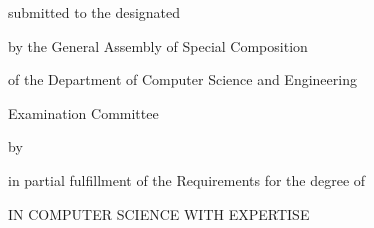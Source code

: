 \makeatletter

{\LARGE \@title}

{\Large
	\vfill \vfill \csethesisTypeEn

	\vfill        submitted to the designated

	\vfill        by the General Assembly of Special Composition

	              of the Department of Computer Science and Engineering

	              Examination Committee

	\vfill        by

	\vfill        {\LARGE \@author}

	\vfill        in partial fulfillment of the Requirements for the degree of

	\vfill        \csediplwmaEn

	              IN COMPUTER SCIENCE
	\ifPhD\else
		          WITH EXPERTISE
			
		          \@Ekseidikseusi
	\fi

	\vfill \vfill \@date
}

\clearpage

